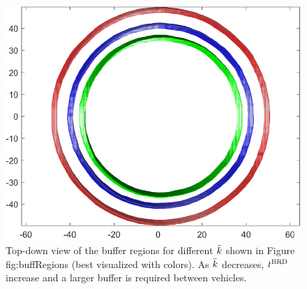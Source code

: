 \begin{figure}[H]
  \centering
  \includegraphics[width=\columnwidth]{"figs/bufferRegions_topdown"}
  \caption{Top-down view of the buffer regions for different $\bar{k}$ shown in Figure {fig:buffRegions} (best visualized with colors). As $\bar{k}$ decreases, $t^\text{BRD}$ increase and a larger buffer is required between vehicles.}
  \label{fig:buffRegions_td}
\end{figure}

